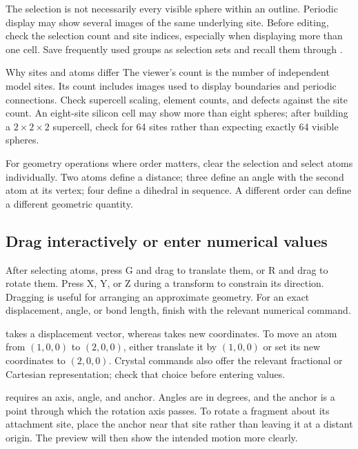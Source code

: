 The selection is not necessarily every visible sphere within an outline. Periodic display may show several images of the same underlying site. Before editing, check the selection count and site indices, especially when displaying more than one cell. Save frequently used groups as selection sets and recall them through .

\begin{notebox}{Why sites and atoms differ}
The viewer's  count is the number of independent model sites. Its  count includes images used to display boundaries and periodic connections. Check supercell scaling, element counts, and defects against the site count. An eight-site silicon cell may show more than eight spheres; after building a $2\times2\times2$ supercell, check for 64 sites rather than expecting exactly 64 visible spheres.
\end{notebox}



For geometry operations where order matters, clear the selection and select atoms individually. Two atoms define a distance; three define an angle with the second atom at its vertex; four define a dihedral in sequence. A different order can define a different geometric quantity.

\subsection{Drag interactively or enter numerical values}

After selecting atoms, press G and drag to translate them, or R and drag to rotate them. Press X, Y, or Z during a transform to constrain its direction. Dragging is useful for arranging an approximate geometry. For an exact displacement, angle, or bond length, finish with the relevant numerical command.

 takes a displacement vector, whereas  takes new coordinates. To move an atom from $(1,0,0)$ to $(2,0,0)$, either translate it by $(1,0,0)$ or set its new coordinates to $(2,0,0)$. Crystal commands also offer the relevant fractional or Cartesian representation; check that choice before entering values.

 requires an axis, angle, and anchor. Angles are in degrees, and the anchor is a point through which the rotation axis passes. To rotate a fragment about its attachment site, place the anchor near that site rather than leaving it at a distant origin. The preview will then show the intended motion more clearly.

